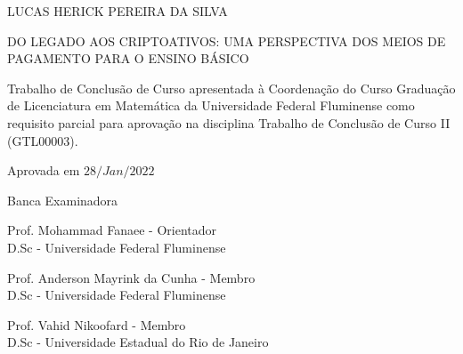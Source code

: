 

\begin{center}
	
	LUCAS HERICK PEREIRA DA SILVA	
	
	\vspace{1cm}
	
\uppercase{Do legado aos criptoativos: uma perspectiva dos meios de pagamento para o ensino b\'asico} 
	\vspace{1.0cm}
	
	\begin{flushright}
		\begin{minipage}{7.75 cm}
			\nohyphens{
			Trabalho de Conclusão de Curso apresentada à Coordenação do Curso Graduação de Licenciatura em Matemática da Universidade Federal Fluminense como requisito parcial para aprovação na disciplina Trabalho de Conclusão de Curso II (GTL00003).
		}
			
		\end{minipage}
	\end{flushright}

\vspace{1cm}

\begin{flushleft}
	Aprovada em
	 $28\slash Jan \slash 2022$
\end{flushleft}	

\vspace{1cm}

Banca Examinadora 

\vspace{1.5cm}

\begin{flushleft}
	Prof. Mohammad Fanaee - Orientador\\
	D.Sc - Universidade Federal Fluminense\\
	
	\vspace{1.1cm}
	
	Prof. Anderson Mayrink da Cunha - Membro\\
	D.Sc - Universidade Federal Fluminense\\
	
	\vspace{1.1cm}
	
	Prof. Vahid Nikoofard - Membro\\
	D.Sc - Universidade Estadual do Rio de Janeiro\\
\end{flushleft}
	
	
	\vfill
	
\end{center}
